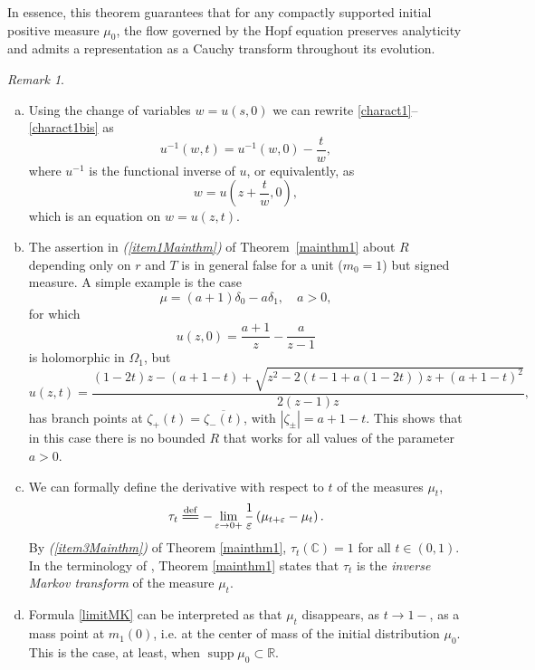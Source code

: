 \documentclass[reqno,11pt]{amsart}
\theoremstyle{plain}
\theoremstyle{definition}
\theoremstyle{remark}
\newtheorem{remark}[thm]{Remark}
\numberwithin{equation}{section}
\numberwithin{equation}{section}
\DeclareMathOperator{\supp}{supp}
\newcommand{\C}{\mathbb{C}}
\newcommand{\R}{\mathbb{R}}
\newcommand{\isdef}{\overset{\mathrm{def}}{=\joinrel=}}
\begin{document}
In essence, this theorem guarantees that for any compactly supported initial positive measure $\mu_0$, the flow governed by the Hopf equation preserves analyticity and admits a representation as a Cauchy transform throughout its evolution.
\begin{remark} \label{remark22}
\begin{enumerate}[(a)]
\item Using the change of variables $w=u(s, 0)$ we can rewrite \eqref{charact1}--\eqref{charact1bis} as
\begin{equation} \label{charact2}
	u^{-1} (w, t) = u^{-1} (w, 0) -\frac{t}{w},
\end{equation}
where $u^{-1}$ is the functional inverse of $u$, or equivalently, as
 \begin{equation} \label{Shapiro}
 w=u\left(z+\frac{t}{w}, 0\right),
 \end{equation}
 which is an equation on $w=u(z, t)$.
 
\item	The assertion in  \textit{(\ref{item1Mainthm})} of Theorem~\ref{mainthm1} about $R$ depending only on $r$ and $T$ is in general false for a unit ($m_0=1$) but signed measure. A simple example is the case
	$$
	\mu = (a+1)\delta_0 - a\delta_1, \quad a>0,
	$$
	for which  
	\begin{equation}
	    \label{examplesigned}
     u(z,0)=\frac{a+1}{z}-\frac{a}{z-1}
	\end{equation}
	is holomorphic in $\Omega_1$, but
	$$
	u(z,t)= \frac{(1-2 t) z - (a+1-t)+\sqrt{z^2-2(t-1+a(1-2t))z + (a+1-t)^2}}{2 (z-1) z},
	$$
has branch points at $\zeta_+(t)=\overline{\zeta_-(t)}$, with $|\zeta_{\pm}|=a+1-t$. This shows that in this case there is no bounded $R$ that works for all values of the parameter $a>0$.

\item We can formally define the derivative with respect to $t$ of the measures $\mu_t$,
	$$
	\tau_t \isdef -\lim_{\varepsilon\to 0+} \frac{1}{\varepsilon}\left( \mu_{t+\varepsilon} -\mu_t \right).
 	$$
By \textit{(\ref{item3Mainthm})} of Theorem \ref{mainthm1}, $\tau_t (\C)=1$ for all $t\in (0,1)$. In the terminology of \cite{MR1618739}, Theorem \ref{mainthm1} states that $\tau_t$ is the \textit{inverse Markov transform} of the measure $\mu_t$. 

\item Formula \eqref{limitMK} can be interpreted as that $\mu_t$ disappears, as $t\to 1-$, as a mass point at $m_1(0)$, i.e. at the center of mass of the initial distribution $\mu_0$. This is the case, at least, when $\supp \mu_0\subset \R$.
\end{enumerate}
\end{remark}
 
\end{document}

